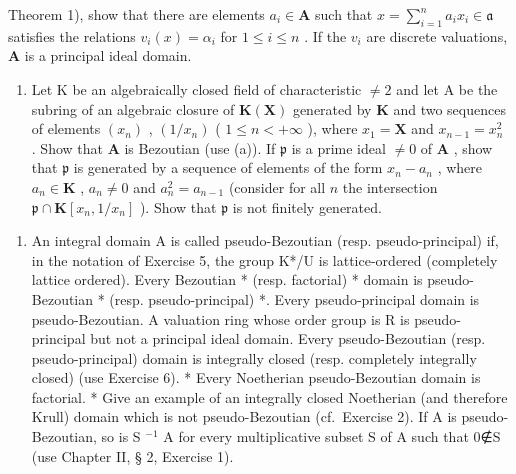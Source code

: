 Theorem 1), show that there are elements \(a_i \in \mathbf{A}\) such that \(x = \sum_{i=1}^{n} a_i x_i \in \mathfrak{a}\) satisfies the relations \(v_i(x) = \alpha_i\) for \(1 \leqslant i \leqslant n\) . If the \(v_i\) are discrete valuations, \(\mathbf{A}\) is a principal ideal domain.

\begin{enumerate}
\def\labelenumi{(\alph{enumi})}
\setcounter{enumi}{2}
\tightlist
\item
  Let K be an algebraically closed field of characteristic \(\neq2\) and let A be the subring of an algebraic closure of \(\mathbf{K}(\mathbf{X})\) generated by \(\mathbf{K}\) and two sequences of elements \((x_{n})\) , \((1 / x_{n})\) ( \(1 \leqslant n < +\infty\) ), where \(x_{1} = \mathbf{X}\) and \(x_{n-1} = x_{n}^{2}\) . Show that \(\mathbf{A}\) is Bezoutian (use (a)). If \(\mathfrak{p}\) is a prime ideal \(\neq 0\) of \(\mathbf{A}\) , show that \(\mathfrak{p}\) is generated by a sequence of elements of the form \(x_{n} - a_{n}\) , where \(a_{n} \in \mathbf{K}\) , \(a_{n} \neq 0\) and \(a_{n}^{2} = a_{n-1}\) (consider for all \(n\) the intersection \(\mathfrak{p} \cap \mathbf{K}[x_{n}, 1 / x_{n}]\) ). Show that \(\mathfrak{p}\) is not finitely generated.
\end{enumerate}

\begin{enumerate}
\def\labelenumi{\arabic{enumi}.}
\setcounter{enumi}{20}
\tightlist
\item
  An integral domain A is called pseudo-Bezoutian (resp. pseudo-principal) if, in the notation of Exercise 5, the group K*/U is lattice-ordered (completely lattice ordered). Every Bezoutian * (resp. factorial) * domain is pseudo-Bezoutian * (resp. pseudo-principal) *. Every pseudo-principal domain is pseudo-Bezoutian. A valuation ring whose order group is R is pseudo-principal but not a principal ideal domain. Every pseudo-Bezoutian (resp. pseudo-principal) domain is integrally closed (resp. completely integrally closed) (use Exercise 6). * Every Noetherian pseudo-Bezoutian domain is factorial. * Give an example of an integrally closed Noetherian (and therefore Krull) domain which is not pseudo-Bezoutian (cf.~Exercise 2). If A is pseudo-Bezoutian, so is S \(^{-1}\) A for every multiplicative subset S of A such that 0∉S (use Chapter II, § 2, Exercise 1).
\end{enumerate}

